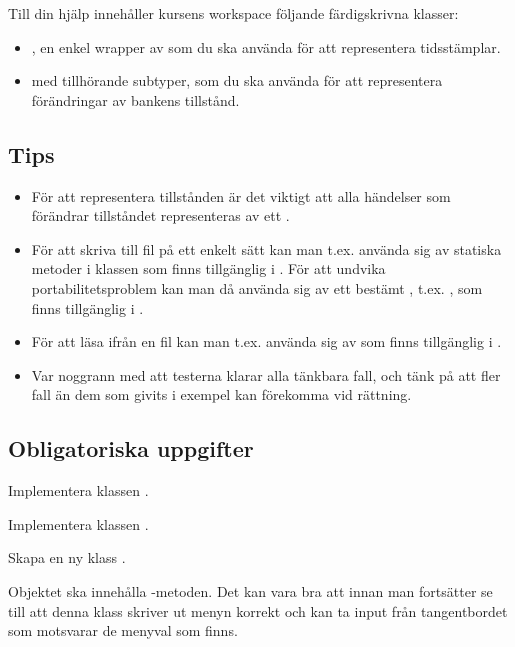 Till din hjälp innehåller kursens workspace följande färdigskrivna klasser:
\begin{itemize}
\item {}, en enkel wrapper av  som du ska använda för att representera tidsstämplar.
\item {} med tillhörande subtyper, som du ska använda för att representera förändringar av bankens tillstånd.
\end{itemize}


\subsection{Tips}

\begin{itemize}
\item För att representera tillstånden är det viktigt att alla händelser som förändrar tillståndet representeras av ett .

\item För att skriva till fil på ett enkelt sätt kan man t.ex. använda sig av statiska metoder i klassen  som finns tillgänglig i . För att undvika portabilitetsproblem kan man då använda sig av ett bestämt , t.ex. , som finns tillgänglig i \newline{}.

\item För att läsa ifrån en fil kan man t.ex. använda sig av  som finns tillgänglig i .

\item Var noggrann med att testerna klarar alla tänkbara fall, och tänk på att fler fall än dem som givits i exempel kan förekomma vid rättning.
\end{itemize}

\subsection{Obligatoriska uppgifter}

\Task Implementera klassen .

\Task Implementera klassen .

\Task Skapa en ny klass .

\Subtask Objektet  ska innehålla -metoden. Det kan vara bra att innan man fortsätter se till att denna klass skriver ut menyn korrekt och kan ta input från tangentbordet som motsvarar de menyval som finns.


